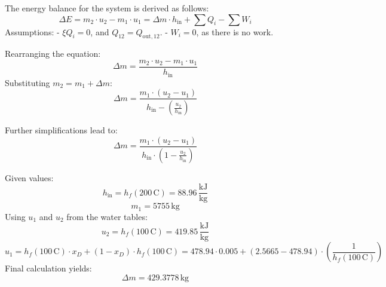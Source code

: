 The energy balance for the system is derived as follows:  
\[
\Delta E = m_2 \cdot u_2 - m_1 \cdot u_1 = \Delta m \cdot h_{\text{in}} + \sum Q_i - \sum W_i
\]  
Assumptions:  
- \( \xi Q_i = 0 \), and \( Q_{12} = Q_{\text{out},12} \).  
- \( W_i = 0 \), as there is no work.  

Rearranging the equation:  
\[
\Delta m = \frac{m_2 \cdot u_2 - m_1 \cdot u_1}{h_{\text{in}}}
\]  
Substituting \( m_2 = m_1 + \Delta m \):  
\[
\Delta m = \frac{m_1 \cdot (u_2 - u_1)}{h_{\text{in}} - \left( \frac{u_2}{h_{\text{in}}} \right)}
\]  

Further simplifications lead to:  
\[
\Delta m = \frac{m_1 \cdot (u_2 - u_1)}{h_{\text{in}} \cdot \left( 1 - \frac{u_2}{h_{\text{in}}} \right)}
\]  

Given values:  
\[
h_{\text{in}} = h_{f}(200 \, \text{C}) = 88.96 \, \frac{\text{kJ}}{\text{kg}}
\]  
\[
m_1 = 5755 \, \text{kg}
\]  
Using \( u_1 \) and \( u_2 \) from the water tables:  
\[
u_2 = h_{f}(100 \, \text{C}) = 419.85 \, \frac{\text{kJ}}{\text{kg}}
\]  
\[
u_1 = h_{f}(100 \, \text{C}) \cdot x_D + (1 - x_D) \cdot h_{f}(100 \, \text{C}) = 478.94 \cdot 0.005 + (2.5665 - 478.94) \cdot \left( \frac{1}{h_{f}(100 \, \text{C})} \right)
\]  
Final calculation yields:  
\[
\Delta m = 429.3778 \, \text{kg}
\]